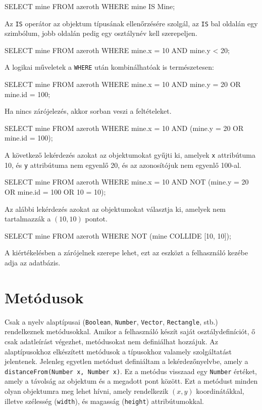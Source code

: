 \begin{sql}
SELECT mine FROM azeroth WHERE mine IS Mine;
\end{sql}

Az \texttt{IS} operátor az objektum típusának ellenőrzésére szolgál, az \texttt{IS} bal oldalán egy szimbólum, jobb oldalán pedig egy osztálynév kell szerepeljen.

\begin{sql}
SELECT mine FROM azeroth WHERE mine.x = 10 AND mine.y < 20;
\end{sql}

A logikai műveletek a \texttt{WHERE} után kombinálhatóak is természetesen:

\begin{sql}
SELECT mine FROM azeroth
WHERE mine.x = 10 AND mine.y = 20 OR mine.id = 100;
\end{sql}

Ha nincs zárójelezés, akkor sorban veszi a feltételeket.

\begin{sql}
SELECT mine FROM azeroth
WHERE mine.x = 10 AND (mine.y = 20 OR mine.id = 100);
\end{sql}

A következő lekérdezés azokat az objektumokat gyűjti ki, amelyek \texttt{x} attribútuma 10, és \texttt{y} attribútuma nem egyenlő 20, és az azonosítójuk nem egyenlő 100-al.

\begin{sql}
SELECT mine FROM azeroth
WHERE mine.x = 10 AND NOT (mine.y = 20 OR mine.id = 100 OR 10 = 10);
\end{sql}

Az alábbi lekérdezés azokat az objektumokat választja ki, amelyek nem tartalmazzák a $(10, 10)$ pontot.
\begin{sql}
SELECT mine FROM azeroth
WHERE NOT (mine COLLIDE [10, 10]);
\end{sql}


A kiértékelésben a zárójelnek szerepe lehet, ezt az eszközt a felhasználó kezébe adja az adatbázis.

\section{Metódusok}

Csak a nyelv alaptípusai (\texttt{Boolean}, \texttt{Number}, \texttt{Vector}, \texttt{Rectangle}, stb.) rendelkeznek metódusokkal. Amikor a felhasználó készít saját osztálydefiníciót, ő csak adatleírást végezhet, metódusokat nem definiálhat hozzájuk. Az alaptípusokhoz elkészített metódusok a típusokhoz valamely szolgáltatást jelentenek. Jelenleg egyetlen metódust definiáltam a lekérdezőnyelvbe, amely a \texttt{distanceFrom(Number x, Number x)}. Ez a metódus visszaad egy \texttt{Number} értéket, amely a távolság az objektum és a megadott pont között. Ezt a metódust minden olyan objektumra meg lehet hívni, amely rendelkezik $(x, y)$ koordinátákkal, illetve szélesség (\texttt{width}), és magasság (\texttt{height}) attribútumokkal.

